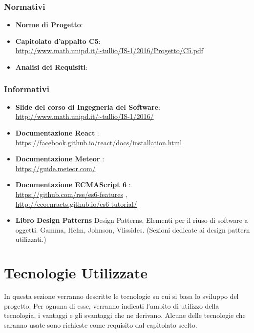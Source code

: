 \subsubsection{Normativi}
\begin{itemize}
	\item \textbf{Norme di Progetto}: \normediprogetto
	\item \textbf{Capitolato d'appalto C5}: \\ \url{http://www.math.unipd.it/~tullio/IS-1/2016/Progetto/C5.pdf}
	\item \textbf{Analisi dei Requisiti}: \analisideirequisiti
	
\end{itemize}


\subsubsection{Informativi}
\begin{itemize}
	\item \textbf{Slide del corso di Ingegneria del Software}:
     	\\  \url{http://www.math.unipd.it/~tullio/IS-1/2016/ }
	\item \textbf{Documentazione React} :  
		\\  \url{https://facebook.github.io/react/docs/installation.html}
	\item \textbf{Documentazione Meteor} : 
		\\  \url{https://guide.meteor.com/}
	\item \textbf{Documentazione ECMAScript 6}  : 
		\\  \url{https://github.com/rse/es6-features} ,
		\\  \url{http://ccoenraets.github.io/es6-tutorial/}
	\item \textbf{Libro Design Patterns} Design Patterns, Elementi per il
  riuso di software a oggetti. Gamma, Helm, Johnson, Vlissides. (Sezioni dedicate ai design pattern utilizzati.)

\end{itemize}

\section{Tecnologie Utilizzate}

In questa sezione verranno descritte le tecnologie su cui si basa lo
sviluppo del progetto. Per ognuna di esse, verranno indicati l’ambito
di utilizzo della tecnologia, i vantaggi e gli svantaggi che ne
derivano. Alcune delle tecnologie che saranno usate sono richieste come requisito dal capitolato scelto.

